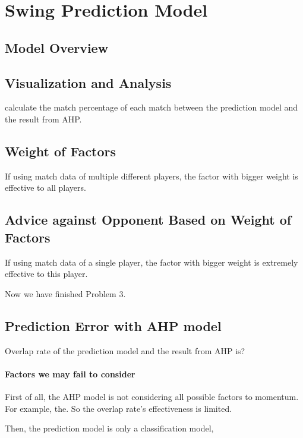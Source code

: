 \section{Swing Prediction Model}

\subsection{Model Overview}

\subsection{Visualization and Analysis}

calculate the match percentage of each match between the prediction model and the result from AHP.

\subsection{Weight of Factors}

If using match data of multiple different players, the factor with bigger weight is effective to 
all players.

\subsection{Advice against Opponent Based on Weight of Factors}

If using match data of a single player, the factor with bigger weight is extremely effective to 
this player.

Now we have finished Problem 3.

\subsection{Prediction Error with AHP model}

Overlap rate of the prediction model and the result from AHP is?

\paragraph{Factors we may fail to consider}

First of all, the AHP model is not considering all possible factors to momentum.
For example, the.
So the overlap rate's effectiveness is limited.

Then, the prediction model is only a classification model,